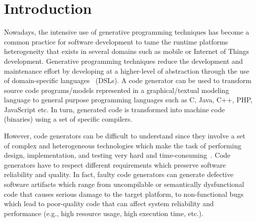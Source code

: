 \section{Introduction}

\enlargethispage{0.5cm}


Nowadays, the intensive use of generative programming techniques has become a common practice for software development to tame the runtime platforms heterogeneity that exists in several domains such as mobile or Internet of Things development.  Generative programming techniques reduce the development and maintenance effort by developing at a higher-level of abstraction through the use of domain-specific languages~\cite{brambilla2012model} (DSLs). 
A code generator can be used to transform source code programs/models represented in a graphical/textual modeling language to general purpose programming languages such as C, Java, C++, PHP, JavaScript etc. In turn, generated code is transformed into machine code (binaries) using a set of specific compilers.


However, code generators can be difficult to understand since they involve a set of complex and heterogeneous technologies which make the task of performing design, implementation, and testing very hard and time-consuming~\cite{france2007model,guana2015developers}. Code generators have to respect different requirements which preserve software reliability and quality. In fact, faulty code generators can generate defective software artifacts which range from uncompilable or semantically dysfunctional code that causes serious damage to the target platform, to non-functional bugs which lead to poor-quality code that can affect system reliability and performance (e.g., high resource usage, high execution time, etc.). 

